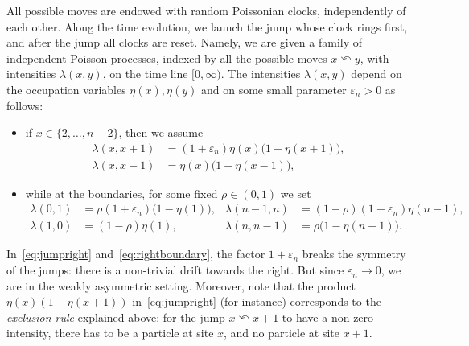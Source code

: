 \documentclass[AHL,Unicode,longabstracts]{cedram}
\begin{document}
All possible moves are endowed with random Poissonian clocks, independently of each other. Along the time evolution, we launch the jump whose clock rings first, and after the jump all clocks are reset. Namely, we are given a family of independent Poisson processes, indexed by all the possible moves $x
\curvearrowleft y $, with intensities $\lambda(x,y)$, on the time line $[0,\infty)$. The intensities $\lambda(x,y)$ depend on the occupation variables $\eta(x),\eta(y)$ and on some small parameter $\varepsilon_n >0$ as follows:
\begin{itemize}
\item if $x \in \{2,\dots,n-2\}$, then we assume
\begin{align}
\lambda(x,x+1) & = (1+\varepsilon_n)\eta(x)\big(1-\eta(x+1)\big), \label{eq:jumpright}
\\
\lambda(x,x-1) & = \eta(x)\big(1-\eta(x-1)\big), \label{eq:jumpleft}
\end{align}
\item while at the boundaries, for some fixed $\rho \in(0,1)$ we set
\begin{align}
\lambda(0,1) & = \rho(1+\varepsilon_n) \big(1-\eta(1)\big), &\lambda(n-1,n)& = (1-\rho)(1+\varepsilon_n)\eta(n-1), \label{eq:rightboundary}
\\
\lambda(1,0)& = (1-\rho)\eta(1), &\lambda(n,n-1) &= \rho\big(1-\eta(n-1)\big).\label{eq:leftboundary}
\end{align}
\end{itemize}
In~\eqref{eq:jumpright} and~\eqref{eq:rightboundary}, the factor $1+\varepsilon_n$ breaks the symmetry of the jumps: there is a non-trivial drift towards the right. But since $\varepsilon_n \to 0$, we are in the weakly asymmetric setting. Moreover, note that the product $\eta(x)(1-\eta(x+1))$ in~\eqref{eq:jumpright} (for instance) corresponds to the \emph{exclusion rule} explained above: for the jump $x\curvearrowleft x+1$ to have a non-zero intensity, there has to be a particle at site $x$, and no particle at site $x+1$.
\end{document}
